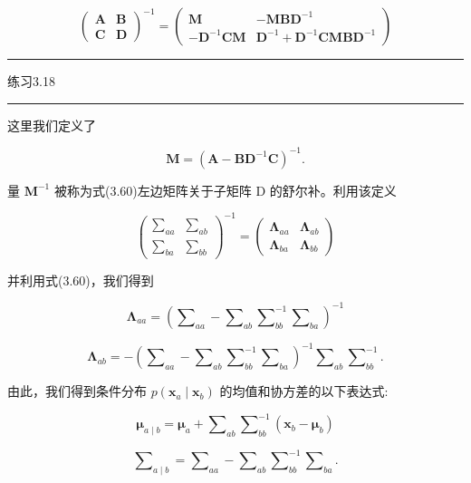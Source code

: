 \documentclass[10pt]{report}
\newcommand{\HRule}{\begin{center}\rule{0.9\linewidth}{0.2mm}\end{center}}
\begin{document}
\[
{\left( \begin{array}{ll} \mathbf{A} & \mathbf{B} \\  \mathbf{C} & \mathbf{D} \end{array}\right) }^{-1} = \left( \begin{matrix} \mathbf{M} &  - \mathbf{{MB}}{\mathbf{D}}^{-1} \\   - {\mathbf{D}}^{-1}\mathbf{{CM}} & {\mathbf{D}}^{-1} + {\mathbf{D}}^{-1}\mathbf{{CMB}}{\mathbf{D}}^{-1} \end{matrix}\right)  \tag{3.60}
\]

\HRule

练习3.18

\HRule

这里我们定义了

\[
\mathbf{M} = {\left( \mathbf{A} - {\mathbf{{BD}}}^{-1}\mathbf{C}\right) }^{-1}. \tag{3.61}
\]

量 \({\mathbf{M}}^{-1}\) 被称为式(3.60)左边矩阵关于子矩阵 D 的舒尔补。利用该定义

\[
{\left( \begin{matrix} {\mathbf{\sum }}_{aa} & {\mathbf{\sum }}_{ab} \\  {\mathbf{\sum }}_{ba} & {\mathbf{\sum }}_{bb} \end{matrix}\right) }^{-1} = \left( \begin{matrix} {\mathbf{\Lambda }}_{aa} & {\mathbf{\Lambda }}_{ab} \\  {\mathbf{\Lambda }}_{ba} & {\mathbf{\Lambda }}_{bb} \end{matrix}\right)  \tag{3.62}
\]

并利用式(3.60)，我们得到

\[
{\mathbf{\Lambda }}_{aa} = {\left( {\mathbf{\sum }}_{aa} - {\mathbf{\sum }}_{ab}{\mathbf{\sum }}_{bb}^{-1}{\mathbf{\sum }}_{ba}\right) }^{-1} \tag{3.63}
\]

\[
{\mathbf{\Lambda }}_{ab} =  - {\left( {\mathbf{\sum }}_{aa} - {\mathbf{\sum }}_{ab}{\mathbf{\sum }}_{bb}^{-1}{\mathbf{\sum }}_{ba}\right) }^{-1}{\mathbf{\sum }}_{ab}{\mathbf{\sum }}_{bb}^{-1}. \tag{3.64}
\]

由此，我们得到条件分布 \(p\left( {{\mathbf{x}}_{a} \mid  {\mathbf{x}}_{b}}\right)\) 的均值和协方差的以下表达式:

\[
{\mathbf{\mu }}_{a \mid  b} = {\mathbf{\mu }}_{a} + {\mathbf{\sum }}_{ab}{\mathbf{\sum }}_{bb}^{-1}\left( {{\mathbf{x}}_{b} - {\mathbf{\mu }}_{b}}\right)  \tag{3.65}
\]

\[
{\mathbf{\sum }}_{a \mid  b} = {\mathbf{\sum }}_{aa} - {\mathbf{\sum }}_{ab}{\mathbf{\sum }}_{bb}^{-1}{\mathbf{\sum }}_{ba}. \tag{3.66}
\]
\end{document}
